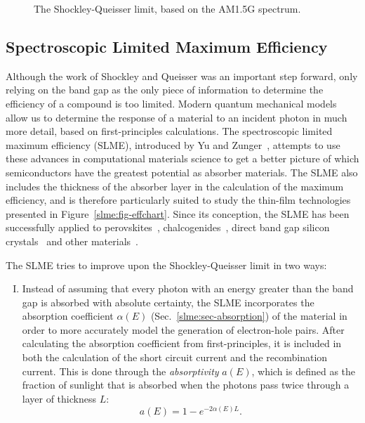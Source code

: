 \begin{refsection}
\begin{figure}[ht]  
\centering 

\caption{\label{slme:fig-SQlimit} The Shockley-Queisser limit, based on the 
AM1.5G spectrum.} 
\end{figure} 
 
\subsection{Spectroscopic Limited Maximum Efficiency} \label{slme:sec-SLME} 
 
Although the work of Shockley and Queisser was an important step forward, only 
relying on the band gap as the only piece of information to determine the 
efficiency of a compound is too limited. Modern quantum mechanical models 
allow us to determine the response of a material to an incident photon in much 
more detail, based on first-principles calculations. The 
spectroscopic limited maximum efficiency (SLME), introduced by Yu and 
Zunger~\cite{Yu2012}, attempts to use these advances in computational materials science 
to get a better picture of which semiconductors have the greatest potential as 
absorber materials. The \gls{SLME} also includes the thickness of the absorber layer 
in the calculation of the maximum efficiency, and is therefore particularly 
suited to study the thin-film technologies presented in 
Figure~\ref{slme:fig-effchart}. Since its conception, the \gls{SLME} has been 
successfully applied to perovskites~\cite{Yin2014, Yin2015, Yin2015b, 
Meng2016}, chalcogenides~\cite{Hong2016, Sarmadian2016}, direct band gap 
silicon crystals~\cite{Lee2014, Oh2015} and other materials~\cite{Yu2012b, 
Yokoyama2013, Heo2014, Huang2015}.  

The \gls{SLME} tries to improve upon the Shockley-Queisser limit in two ways:  
\vspace{0.1in} 
\begin{enumerate}[I.] 
 
\item Instead of assuming that every photon with an energy greater than the 
band gap is absorbed with absolute certainty, the \gls{SLME} incorporates the 
absorption coefficient $\alpha(E)$ (Sec.~\ref{slme:sec-absorption}) of the 
material in order to more accurately model the generation of electron-hole 
pairs. After calculating the absorption coefficient from first-principles, it is 
included in both the calculation of the short circuit current and the 
recombination current. This is done through the \textit{absorptivity} $a(E)$, 
which is defined as the fraction of sunlight that is absorbed when the photons 
pass twice through a layer of thickness $L$: 
\begin{equation} \label{slme:eq-absorptivity} 
a(E) = 1 - e^{-2 \alpha(E) L}. 
\end{equation} 
 

\end{enumerate}
\end{refsection}
